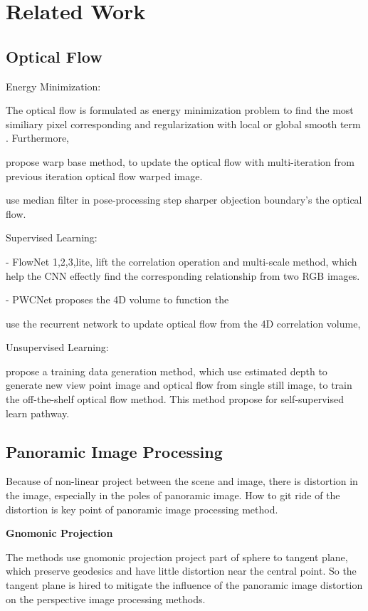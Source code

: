 \section{Related Work}

\subsection{Optical Flow}

Energy Minimization:

The optical flow is formulated as energy minimization problem to find the most similiary pixel corresponding and regularization with local or global smooth term \cite{KroegTDV2016, HornS1981, BA}. Furthermore, 

\citet{BroxBPW2004} propose warp base method, to update the optical flow with multi-iteration from previous iteration optical flow warped image.

\cite{sun} use median filter in pose-processing step sharper objection boundary's the optical flow.

Supervised Learning:

- FlowNet 1,2,3,lite, lift the correlation operation and multi-scale method, which help the CNN effectly find the corresponding relationship from two RGB images. 

- PWCNet proposes the 4D volume to function the 

\citet{TeedD2020a} use the recurrent network to update optical flow from the 4D correlation volume, 

Unsupervised Learning:

\citet{AleotPM2021} propose a training data generation method, 
which use estimated depth to generate new view point image and optical flow from single still image, to train the off-the-shelf optical flow method.
This method propose for self-supervised learn pathway.


\subsection{Panoramic Image Processing}

Because of non-linear project between the scene and image, there is distortion in the image, especially in the poles of panoramic image.
How to git ride of the distortion is key point of panoramic image processing method. 

\textbf{Gnomonic Projection} ~\cite{gnomonicprojection}

The methods use gnomonic projection project part of sphere to tangent plane, which preserve geodesics and have little distortion near the central point.
So the tangent plane is hired to mitigate the influence of the panoramic image  distortion on the perspective image processing methods.

